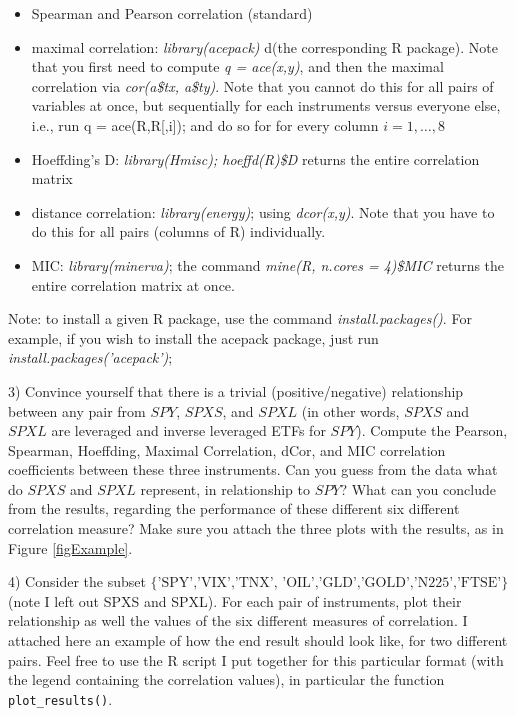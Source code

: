 \documentclass[12pt]{article}
\begin{document}
\begin{itemize}
\item Spearman and Pearson correlation (standard)
\item maximal correlation: \textit{library(acepack)} d(the corresponding R package).  Note that you first need to compute \textit{q = ace(x,y)}, and then the maximal correlation via \textit{cor(a\$tx, a\$ty)}. Note that you cannot do this for all pairs of variables at once, but sequentially for each instruments versus everyone else, i.e., run q = ace(R,R[,i]); and do so for for every column  $i=1,\ldots,8$
\item Hoeffding's D:  \textit{library(Hmisc); hoeffd(R)\$D}  returns the entire correlation matrix
\item distance correlation: \textit{library(energy)}; using \textit{dcor(x,y)}. Note that you have to do this for all pairs (columns of R) individually.
\item MIC:  \textit{library(minerva)}; the command 
\textit{mine(R, n.cores = 4)\$MIC}  returns the entire correlation matrix at once.
\end{itemize}


Note: to install a given R package, use the command \textit{install.packages()}. For example, if you wish to install the acepack package, just run \textit{install.packages('acepack')};

\vspace{3mm}

3) Convince yourself that there is a trivial (positive/negative) relationship between any pair from $SPY$, $SPXS$, and $SPXL$
(in other words, $SPXS$ and $SPXL$ are leveraged and inverse leveraged ETFs for $SPY$). Compute the Pearson, Spearman, Hoeffding, Maximal Correlation, dCor, and MIC correlation coefficients between these three instruments. Can you guess from the data what do $SPXS$ and $SPXL$ represent, in relationship to $SPY$? What can you conclude from the results, regarding the performance of these different six different correlation measure? Make sure you attach  the three plots with the results, as in Figure \ref{figExample}.

\vspace{3mm}

4) Consider the subset $\{ \mbox{'SPY','\^{}VIX','\^{}TNX', 'OIL','GLD','GOLD','\^{}N225','\^{}FTSE'} \}$ (note I left out SPXS and SPXL). For each pair of instruments, plot their relationship as well the values of the six different measures of correlation. I attached here an example of how the end result should look like, for two different pairs. Feel free to use the R script I put together for this particular format (with the legend containing the correlation values), in particular the function \texttt{plot\_results()}.
\end{document}
